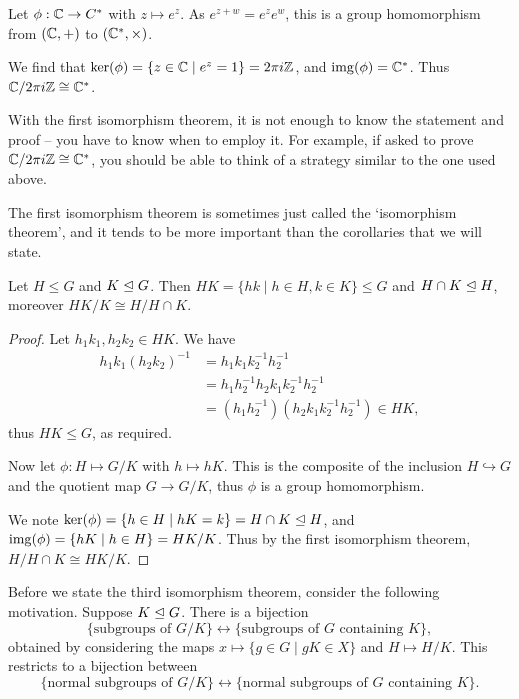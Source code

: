 \documentclass[a4paper]{scrartcl}
\begin{document}
\begin{example}
	Let $\phi : \mathbb{C} \rightarrow C^{*}$ with $z \mapsto e^z$. As $e^{z + w} = e^z e^w$, this is a group homomorphism from $(\mathbb{C}, +)$ to $(\mathbb{C}^*, \times)$. 

	We find that $\operatorname{ker}(\phi) = \{ z \in \mathbb{C} \mid e^z = 1 \} = 2 \pi i \mathbb{Z}$, and $\operatorname{img}(\phi) = \mathbb{C}^*$. Thus $\mathbb{C}/2 \pi i \mathbb{Z} \cong \mathbb{C}^*$.
\end{example}

With the first isomorphism theorem, it is not enough to know the statement and proof -- you have to know when to employ it. For example, if asked to prove $\mathbb{C}/2 \pi i \mathbb{Z} \cong \mathbb{C}^*$, you should be able to think of a strategy similar to the one used above.

The first isomorphism theorem is sometimes just called the `isomorphism theorem', and it tends to be more important than the corollaries that we will state.

\begin{corollary}
	Let $H \leq G$ and $K \trianglelefteq G$. Then $HK = \{hk \mid h \in H, k \in K \} \leq G$ and $H \cap K \trianglelefteq H$, moreover $HK/K \cong H/H \cap K$.
\end{corollary}
\begin{proof}
	Let $h_1 k_1, h_2 k_2 \in HK$. We have
	\begin{align*}
		h_1 k_1 (h_2 k_2)^{-1} &= h_1 k_1 k_2^{-1} h_2^{-1} \\&= h_1 h_2^{-1} h_2 k_1 k_2^{-1} h_2^{-1} \\&= (h_1 h_2^{-1}) (h_2 k_1 k_2^{-1} h_2^{-1}) \in HK,
	\end{align*}
	thus $HK \leq G$, as required.

	Now let $\phi:H \mapsto G/K$ with $h \mapsto hK$. This is the composite of the inclusion $H \hookrightarrow G$ and the quotient map $G \rightarrow G/K$, thus $\phi$ is a group homomorphism.

	We note $\operatorname{ker}(\phi) = \{h \in H \mid hK = k\} = H \cap K \trianglelefteq H$, and $\operatorname{img}(\phi) =\{hK \mid h \in H \} = HK / K$. Thus by the first isomorphism theorem,
	$
	H/H \cap K \cong HK/K.
	$
\end{proof}

Before we state the third isomorphism theorem, consider the following motivation. Suppose $K \trianglelefteq G$. There is a bijection
$$
\{\text{subgroups of } G/K \} \longleftrightarrow \{ \text{subgroups of } G \text{ containing }K \},
$$
obtained by considering the maps $x \mapsto \{g \in G \mid gK \in X \}$ and $H \mapsto H/K$. This restricts to a bijection between 
$$
\{\text{normal subgroups of }G/K \} \longleftrightarrow \{\text{normal subgroups of }G\text{ containing }K\}.
$$
\end{document}
